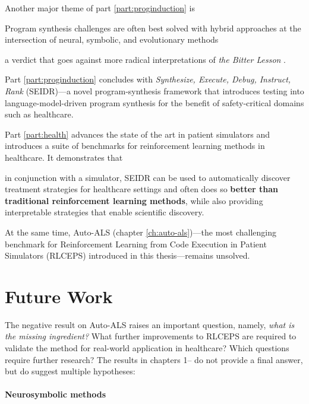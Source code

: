 Another major theme of part \ref{part:proginduction} is

\begin{highlight}
Program synthesis challenges are often best solved with hybrid approaches at the intersection of neural, symbolic, and evolutionary methods
\end{highlight}

a verdict that goes against more radical interpretations of \emph{the Bitter Lesson} \cite{BitterLesson2019,traskBitterLessonsBitter2025}.

Part \ref{part:proginduction} concludes with \emph{Synthesize, Execute, Debug, Instruct, Rank} (SEIDR)---a novel program-synthesis framework that introduces testing into language-model-driven program synthesis for the benefit of safety-critical domains such as healthcare.

Part \ref{part:health} advances the state of the art in patient simulators and introduces a suite of benchmarks for reinforcement learning methods in healthcare. It demonstrates that 

\begin{highlight}
in conjunction with a simulator, SEIDR can be used to automatically discover treatment strategies for healthcare settings and often does so \textbf{better than traditional reinforcement learning methods}, while also providing interpretable strategies that enable scientific discovery.
\end{highlight}

At the same time, Auto-ALS (chapter \ref{ch:auto-als})---the most challenging benchmark for Reinforcement Learning from Code Execution in Patient Simulators (RLCEPS) introduced in this thesis---remains unsolved.

\newpage
\section{Future Work}

The negative result on Auto-ALS raises an important question, namely, \emph{what is the missing ingredient?}
What further improvements to RLCEPS are required to validate the method for real-world application in healthcare?
Which questions require further research?
The results in chapters 1--\prevchap{} do not provide a final answer, but do suggest multiple hypotheses:

\paragraph{Neurosymbolic methods}

